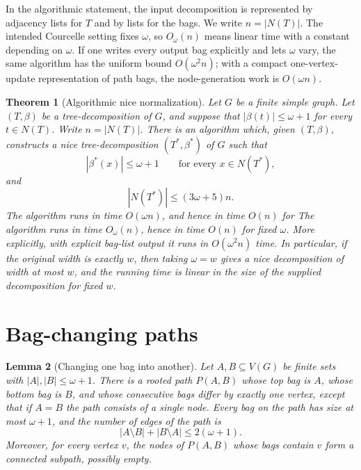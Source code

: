 \documentclass[11pt]{article}
\newtheorem{theorem}{Theorem}
\newtheorem{lemma}[theorem]{Lemma}
\theoremstyle{definition}
\newcommand{\Nodes}{N}
\begin{document}
In the algorithmic statement, the input decomposition is represented by
adjacency lists for \(T\) and by lists for the bags.  We write
\(n=|\Nodes(T)|\).  The intended Courcelle setting fixes \(\omega\), so
\(O_\omega(n)\) means linear time with a constant depending on \(\omega\).  If
one writes every output bag explicitly and lets \(\omega\) vary, the same
algorithm has the uniform bound \(O(\omega^2 n)\); with a compact
one-vertex-update representation of path bags, the node-generation work is
\(O(\omega n)\).

\begin{theorem}[Algorithmic nice normalization]\label{thm:nice-normalization}
Let \(G\) be a finite simple graph.  Let \((T,\beta)\) be a
tree-decomposition of \(G\), and suppose that \(|\beta(t)|\le \omega+1\) for
every \(t\in\Nodes(T)\).  Write \(n=|\Nodes(T)|\).  There is an algorithm which,
given \((T,\beta)\), constructs a nice tree-decomposition
\((T^\ast,\beta^\ast)\) of \(G\) such that
\[
  |\beta^\ast(x)|\le \omega+1
  \qquad\text{for every }x\in\Nodes(T^\ast),
\]
and
\[
  |\Nodes(T^\ast)|\le (3\omega+5)n.
\]
The algorithm runs in time \(O(\omega n)\), and hence in time \(O(n)\) for
The algorithm runs in time \(O_\omega(n)\), hence in time \(O(n)\) for fixed
\(\omega\).  More explicitly, with explicit bag-list output it runs in
\(O(\omega^2 n)\) time.  In particular, if the original width is exactly \(w\),
then taking \(\omega=w\) gives a nice decomposition of width at most \(w\), and
the running time is linear in the size of the supplied decomposition for fixed
\(w\).
\end{theorem}

\section{Bag-changing paths}

\begin{lemma}[Changing one bag into another]\label{lem:bag-path}
Let \(A,B\subseteq V(G)\) be finite sets with
\(|A|,|B|\le \omega+1\).  There is a rooted path \(P(A,B)\) whose top bag is
\(A\), whose bottom bag is \(B\), and whose consecutive bags differ by exactly
one vertex, except that if \(A=B\) the path consists of a single node.  Every
bag on the path has size at most \(\omega+1\), and the number of edges of the
path is
\[
  |A\setminus B|+|B\setminus A|\le 2(\omega+1).
\]
Moreover, for every vertex \(v\), the nodes of \(P(A,B)\) whose bags contain
\(v\) form a connected subpath, possibly empty.
\end{lemma}
\end{document}
